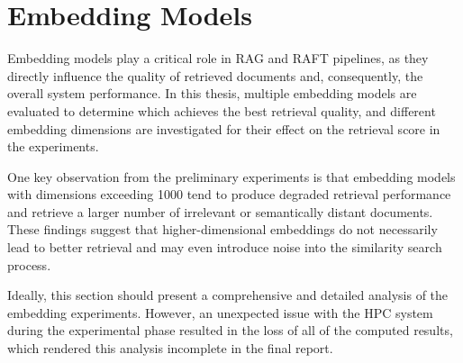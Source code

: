 
\section{Embedding Models}
\label{sec:embedding-models}

Embedding models play a critical role in RAG and RAFT pipelines, as they directly influence the quality of retrieved documents and, consequently, the overall system performance. In this thesis, multiple embedding models are evaluated to determine which achieves the best retrieval quality, and different embedding dimensions are investigated for their effect on the retrieval score in the experiments.

One key observation from the preliminary experiments is that embedding models with dimensions exceeding 1000 tend to produce degraded retrieval performance and retrieve a larger number of irrelevant or semantically distant documents. These findings suggest that higher-dimensional embeddings do not necessarily lead to better retrieval and may even introduce noise into the similarity search process.

Ideally, this section should present a comprehensive and detailed analysis of the embedding experiments. However, an unexpected issue with the HPC system during the experimental phase resulted in the loss of all of the computed results, which rendered this analysis incomplete in the final report.